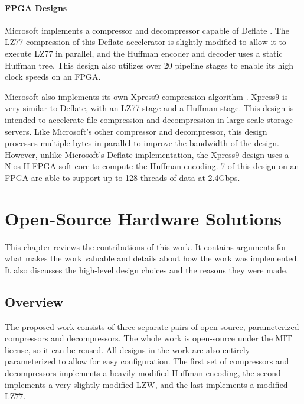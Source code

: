 \documentclass[doublespace,nopageskip]{VTthesis}
\begin{document}
\subsubsection{FPGA Designs}\label{sss:fpga_designs}

Microsoft implements a compressor and decompressor capable of Deflate \cite{microsoft}. The LZ77 compression of this Deflate accelerator is slightly modified to allow it to execute LZ77 in parallel, and the Huffman encoder and decoder uses a static Huffman tree. This design also utilizes over 20 pipeline stages to enable its high clock speeds on an FPGA.

Microsoft also implements its own Xpress9 compression algorithm \cite{xpress9}. Xpress9 is very similar to Deflate, with an LZ77 stage and a Huffman stage. This design is intended to accelerate file compression and decompression in large-scale storage servers. Like Microsoft's other compressor and decompressor, this design processes multiple bytes in parallel to improve the bandwidth of the design. However, unlike Microsoft's Deflate implementation, the Xpress9 design uses a Nios II FPGA soft-core to compute the Huffman encoding. 7 of this design on an FPGA are able to support up to 128 threads of data at 2.4Gbps.

\chapter{Open-Source Hardware Solutions} \label{ch:open-source_hardware_solutions}
This chapter reviews the contributions of this work. It contains arguments for what makes the work valuable and details about how the work was implemented. It also discusses the high-level design choices and the reasons they were made.

\section{Overview}\label{se:overview}
The proposed work consists of three separate pairs of open-source, parameterized compressors and decompressors. The whole work is open-source under the MIT license, so it can be reused. All designs in the work are also entirely parameterized to allow for easy configuration. The first set of compressors and decompressors implements a heavily modified Huffman encoding, the second implements a very slightly modified LZW, and the last implements a modified LZ77.
\end{document}
